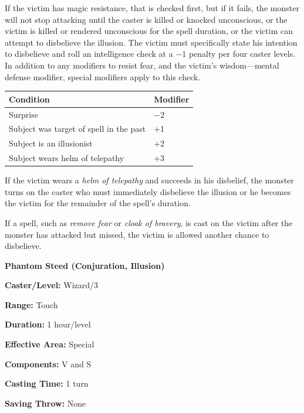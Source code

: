 \begin{multicols}{2}
If the victim has magic resistance, that is checked first, but if it fails, the monster will not stop attacking until the caster is killed or knocked unconscious, or the victim is killed or rendered unconscious for the spell duration, or the victim can attempt to disbelieve the illusion.  The victim must specifically state his intention to disbelieve and roll an intelligence check at a $-1$ penalty per four caster levels.  In addition to any modifiers to resist fear, and the victim's wisdom---mental defense modifier, special modifiers apply to this check.  

\noindent
\begin{tabular}{|p{}|p{}|}
\hline
Condition	& Modifier \\
\hline\hline
\rowcolor[gray]{.9}Surprise	& $-2$ \\
Subject was target of spell in the past	& +1 \\
\rowcolor[gray]{.9}Subject is an illusionist	& +2 \\
Subject wears helm of telepathy	& +3 \\
\hline
\end{tabular}

If the victim wears a \textit{helm of telepathy} and succeeds in his disbelief, the monster turns on the caster who must immediately disbelieve the illusion or he becomes the victim for the remainder of the spell's duration.  

If a spell, such as \textit{remove fear} or \textit{cloak of bravery}, is cast on the victim after the monster has attacked but missed, the victim is allowed another chance to disbelieve.

\vspace{1em}

\noindent
\begin{minipage}{\columnwidth}

\noindent \textbf{Phantom Steed (Conjuration, Illusion)}

\noindent \textbf{Caster/Level:} Wizard/3

\noindent \textbf{Range:} Touch

\noindent \textbf{Duration:} 1 hour/level

\noindent \textbf{Effective Area:} Special

\noindent \textbf{Components:} V and S

\noindent \textbf{Casting Time:} 1 turn

\noindent \textbf{Saving Throw:} None


\end{minipage}
\end{multicols}
